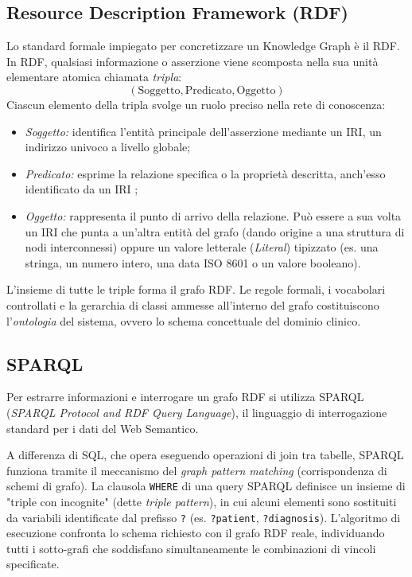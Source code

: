 \documentclass[12pt,a4paper,openright,twoside]{book}
\begin{document}
\subsection{Resource Description Framework (RDF)}
Lo standard formale impiegato per concretizzare un Knowledge Graph è il
\acf{RDF}. In RDF, qualsiasi informazione o asserzione viene scomposta nella sua
unità elementare atomica chiamata \textit{tripla}:
\[
    (\text{Soggetto}, \text{Predicato}, \text{Oggetto})
\]
Ciascun elemento della tripla svolge un ruolo preciso nella rete di conoscenza:
\begin{itemize}
    \item \textit{Soggetto:} identifica l'entità principale dell'asserzione
          mediante un \ac{IRI}, un indirizzo univoco a livello globale;
    \item \textit{Predicato:} esprime la relazione specifica o la proprietà
          descritta, anch'esso identificato da un IRI ;
    \item \textit{Oggetto:} rappresenta il punto di arrivo della relazione. Può
          essere a sua volta un IRI che punta a un'altra entità del grafo (dando
          origine a una struttura di nodi interconnessi) oppure un valore
          letterale (\textit{Literal}) tipizzato (es. una stringa, un numero
          intero, una data ISO 8601 o un valore booleano).
\end{itemize}

L'insieme di tutte le triple forma il grafo RDF. Le regole formali, i vocabolari
controllati e la gerarchia di classi ammesse all'interno del grafo costituiscono
l'\textit{ontologia} del sistema, ovvero lo schema concettuale del dominio
clinico.

\subsection{SPARQL}
Per estrarre informazioni e interrogare un grafo RDF si utilizza SPARQL
(\textit{SPARQL Protocol and RDF Query Language}), il linguaggio di
interrogazione standard per i dati del Web Semantico.

A differenza di SQL, che opera eseguendo operazioni di join tra tabelle, SPARQL
funziona tramite il meccanismo del \textit{graph pattern matching}
(corrispondenza di schemi di grafo). La clausola \texttt{WHERE} di una query
SPARQL definisce un insieme di "triple con incognite" (dette \textit{triple
    pattern}), in cui alcuni elementi sono sostituiti da variabili identificate dal
prefisso \texttt{?} (es. \texttt{?patient}, \texttt{?diagnosis}). L'algoritmo di
esecuzione confronta lo schema richiesto con il grafo RDF reale, individuando
tutti i sotto-grafi che soddisfano simultaneamente le combinazioni di vincoli
specificate.
\end{document}
